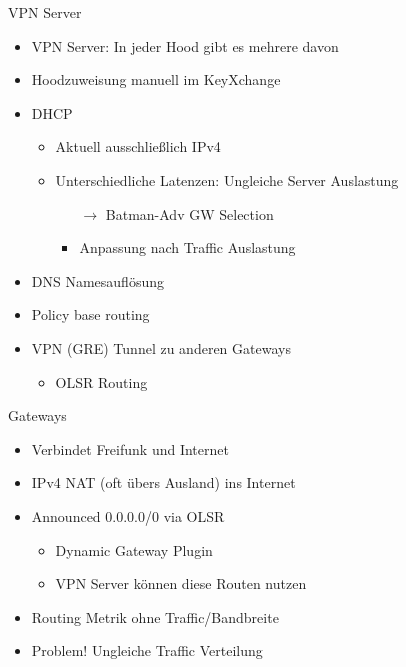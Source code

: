 \begin{frame}{VPN Server}
    \begin{itemize}
        \item VPN Server: In jeder Hood gibt es mehrere davon
        \item Hoodzuweisung manuell im KeyXchange
        \item DHCP
        \begin{itemize}
            \item Aktuell ausschließlich IPv4
            \item Unterschiedliche Latenzen: Ungleiche Server Auslastung
            \begin{itemize}
                \item[$\rightarrow$] Batman-Adv GW Selection
                \item Anpassung nach Traffic Auslastung
            \end{itemize}
        \end{itemize}
        \item DNS Namesauflösung
        \item Policy base routing
        \item VPN (GRE) Tunnel zu anderen Gateways
        \begin{itemize}
            \item OLSR Routing
        \end{itemize}
    \end{itemize}
\end{frame}

\begin{frame}{Gateways}
    \begin{itemize}
        \item Verbindet Freifunk und Internet
        \item IPv4 NAT (oft übers Ausland) ins Internet
        \item Announced 0.0.0.0/0 via OLSR
        \begin{itemize}
            \item Dynamic Gateway Plugin
            \item VPN Server können diese Routen nutzen
        \end{itemize}
        \item Routing Metrik ohne Traffic/Bandbreite
        \item<2> {\color{red}Problem!} Ungleiche Traffic Verteilung
    \end{itemize}
\end{frame}

